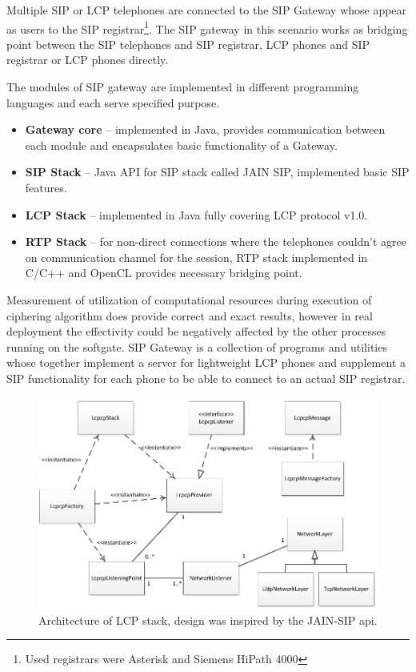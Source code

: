 Multiple SIP or LCP telephones are connected to the SIP Gateway whose appear as
users to the SIP registrar\footnote{ Used registrars were Asterisk and Siemens 
HiPath 4000}. The SIP gateway in this scenario works as bridging point between 
the SIP telephones and SIP registrar, LCP phones and SIP registrar or LCP phones
directly.

The modules of SIP gateway are implemented in different programming languages
and each serve specified purpose.
\begin{itemize}
\item \textbf{Gateway core} -- implemented in Java, provides communication 
between each module and encapsulates basic functionality of a Gateway.
\item \textbf{SIP Stack} -- Java API for SIP stack called 
JAIN SIP\cite{jainsip}, implemented basic SIP features.
\item \textbf{LCP Stack} -- implemented in Java fully covering LCP protocol 
v1.0.
\item \textbf{RTP Stack} -- for non-direct connections where the telephones 
couldn't agree on communication channel for the session, RTP stack implemented
in C/C++ and OpenCL provides necessary bridging point.
\end{itemize}

Measurement of utilization of computational resources during execution of 
ciphering algorithm does provide correct and exact results, however in real 
deployment the effectivity could be negatively affected by the other processes 
running on the softgate. SIP Gateway is a collection of programs and utilities
whose together implement a server for lightweight LCP phones and supplement a
SIP functionality for each phone to be able to connect to an actual SIP 
registrar. 

\begin{figure}[h!]
\centering
\includegraphics[width=15cm]{fig/lcpstack.pdf}
\caption[LCP stack design]{Architecture of LCP stack, design was inspired by the 
JAIN-SIP api\cite{jainsip}.}
\label{lcpstack}
\end{figure}

